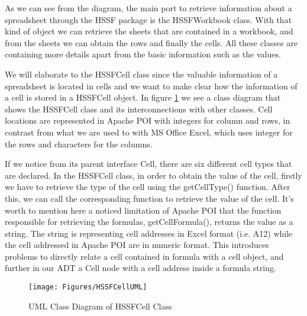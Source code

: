 As we can see from the diagram, the main port to retrieve information about a spreadsheet through the HSSF package is the HSSFWorkbook class. With that kind of object we can retrieve the sheets that are contained in a workbook, and from the sheets we can obtain the rows and finally the cells. All these classes are containing more details apart from the basic information such as the values.

We will elaborate to the HSSFCell class since the valuable information of a spreadsheet is located in cells and we want to make clear how the information of a cell is stored in a HSSFCell object. In figure \ref{fig:HSSFCellUML} we see a class diagram that shows the HSSFCell class and its interconnections with other classes. Cell locations are represented in Apache POI with integers for column and rows, in contrast from what we are used to with MS Office Excel, which uses integer for the rows and characters for the columns.

 If we notice from its parent interface Cell, there are six different cell types that are declared. In the HSSFCell class, in order to obtain the value of the cell, firstly we have to retrieve the type of the cell using the getCellType() function. After this, we can call the corresponding function to retrieve the value of the cell. It's worth to mention here a noticed limitation of Apache POI that the function responsible for retrieving the formulas, getCellFormula(), returns  the value as a string. The string is representing cell addresses in Excel format (i.e. A12) while the cell addressed in Apache POI are in numeric format. This introduces problems to directly relate a cell contained in formula with a cell object, and further in our ADT a Cell node with a cell address inside a formula string. 


\begin{figure}[center]
\texttt{[image: Figures/HSSFCellUML]}
\caption{UML Class Diagram of HSSFCell Class}
\label{fig:HSSFCellUML}
\end{figure}


